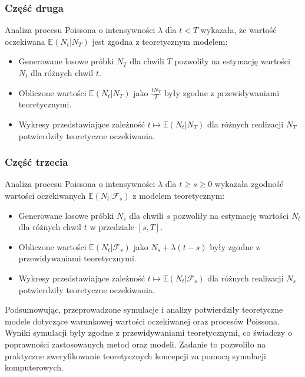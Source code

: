 \documentclass[12pt,letterpaper]{article}
\theoremstyle{definition}
\begin{document}
\subsubsection{Część druga}

Analiza procesu Poissona o intensywności \( \lambda \) dla \( t < T \) wykazała, że wartość oczekiwana \( \mathbb{E}(N_t | N_T) \) jest zgodna z teoretycznym modelem:
\begin{itemize}
    \item Generowane losowe próbki \( N_T \) dla chwili \( T \) pozwoliły na estymację wartości \( N_t \) dla różnych chwil \( t \).
    \item Obliczone wartości \( \mathbb{E}(N_t | N_T) \) jako \( \frac{tN_T}{T} \) były zgodne z przewidywaniami teoretycznymi.
    \item Wykresy przedstawiające zależność \( t \mapsto \mathbb{E}(N_t | N_T) \) dla różnych realizacji \( N_T \) potwierdziły teoretyczne oczekiwania.
\end{itemize}

\subsubsection{Część trzecia}

Analiza procesu Poissona o intensywności \( \lambda \) dla \( t \geq s \geq 0 \) wykazała zgodność wartości oczekiwanych \( \mathbb{E}(N_t | \mathcal{F}_s) \) z modelem teoretycznym:
\begin{itemize}
    \item Generowane losowe próbki \( N_s \) dla chwili \( s \) pozwoliły na estymację wartości \( N_t \) dla różnych chwil \( t \) w przedziale \([s, T]\).
    \item Obliczone wartości \( \mathbb{E}(N_t | \mathcal{F}_s) \) jako \( N_s + \lambda (t - s) \) były zgodne z przewidywaniami teoretycznymi.
    \item Wykresy przedstawiające zależność \( t \mapsto \mathbb{E}(N_t | \mathcal{F}_s) \) dla różnych realizacji \( N_s \) potwierdziły teoretyczne oczekiwania.
\end{itemize}

Podsumowując, przeprowadzone symulacje i analizy potwierdziły teoretyczne modele dotyczące warunkowej wartości oczekiwanej oraz procesów Poissona. Wyniki symulacji były zgodne z przewidywaniami teoretycznymi, co świadczy o poprawności zastosowanych metod oraz modeli. Zadanie to pozwoliło na praktyczne zweryfikowanie teoretycznych koncepcji za pomocą symulacji komputerowych.
\end{document}
